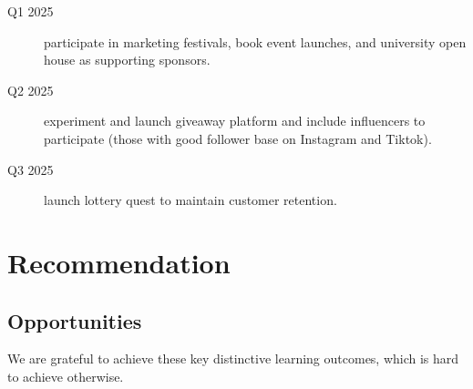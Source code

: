 \begin{description}
	\item[Q1 2025] participate in marketing festivals, book event launches, and university open house as supporting sponsors.
	\item[Q2 2025] experiment and launch giveaway platform and include influencers to participate (those with good follower base on Instagram and Tiktok).
	\item[Q3 2025] launch lottery quest to maintain customer retention.
\end{description}

\section{Recommendation}

\subsection{Opportunities}

We are grateful to achieve these key distinctive learning outcomes, which is hard to achieve otherwise.

